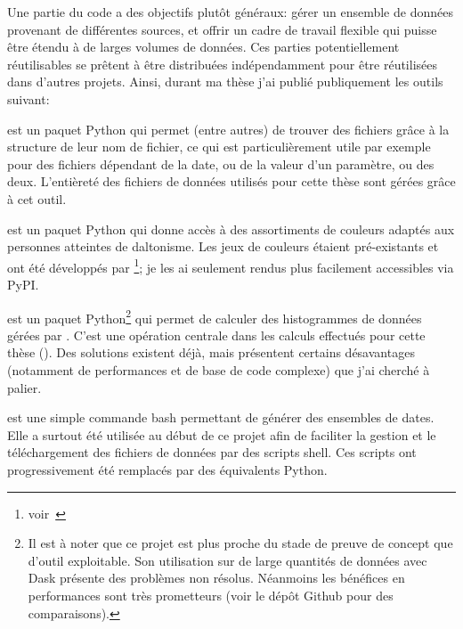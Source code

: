 Une partie du code a des objectifs plutôt généraux: gérer un ensemble de données provenant de différentes sources, et offrir un cadre de travail flexible qui puisse être étendu à de larges volumes de données.
Ces parties potentiellement réutilisables se prêtent à être distribuées indépendamment pour être réutilisées dans d'autres projets.
Ainsi, durant ma thèse j'ai publié publiquement les outils suivant:
\begin{description}
  \setlength{\itemsep}{2\baselineskip}
  \item[FileFinder]
        est un paquet Python qui permet (entre autres) de trouver des fichiers grâce à la structure de leur nom de fichier, ce qui est particulièrement utile par exemple pour des fichiers dépendant de la date, ou de la valeur d'un paramètre, ou des deux.
        L'entièreté des fichiers de données utilisés pour cette thèse sont gérées grâce à cet outil.

  \item[tol-colors]
        est un paquet Python qui donne accès à des assortiments de couleurs adaptés aux personnes atteintes de daltonisme.
        Les jeux de couleurs étaient pré-existants et ont été développés par \footnote{voir~}; je les ai seulement rendus plus facilement accessibles via PyPI.

  \item[Xarray-histogram]
        est un paquet Python\footnote{%
        Il est à noter que ce projet est plus proche du stade de preuve de concept que d'outil exploitable.
        Son utilisation sur de large quantités de données avec Dask présente des problèmes non résolus.
        Néanmoins les bénéfices en performances sont très prometteurs (voir le dépôt Github pour des comparaisons).
        } qui permet de calculer des histogrammes de données gérées par .
        C'est une opération centrale dans les calculs effectués pour cette thèse ().
        Des solutions existent déjà, mais présentent certains désavantages (notamment de performances et de base de code complexe) que j'ai cherché à palier.

  \item[dateloop]
        est une simple commande bash permettant de générer des ensembles de dates.
        Elle a surtout été utilisée au début de ce projet afin de faciliter la gestion et le téléchargement des fichiers de données par des scripts shell. Ces scripts ont progressivement été remplacés par des équivalents Python.

\end{description}

